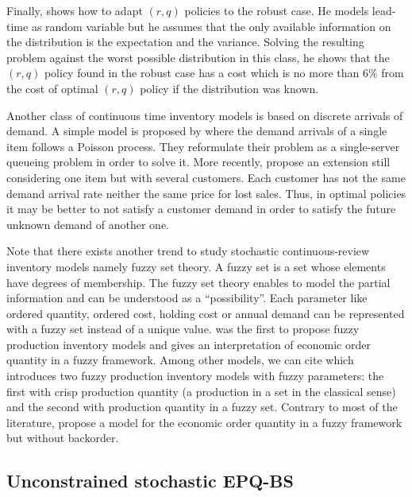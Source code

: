 Finally, \citet{Gallego1998} shows how to adapt $(r,q)$ policies to the robust case.
He models lead-time as random variable but he assumes that the only available information on the distribution is the expectation and the variance.
Solving the resulting problem against the worst possible distribution in this class, he shows that the $(r,q)$ policy found in the robust case has a cost which is no more than 6\% from the cost of optimal $(r,q)$ policy if the distribution was known.


\medskip


Another class of continuous time inventory models is based on discrete arrivals of demand.
A simple model is proposed by \citet{Gavish1980} where the demand arrivals of a single item follows a Poisson process.
They reformulate their problem as a single-server queueing problem in order to solve it.
More recently, \citet{Gayon2009} propose an extension still considering one item but with several customers.
Each customer has not the same demand arrival rate neither the same price for lost sales.
Thus, in optimal policies it may be better to not satisfy a customer demand in order to satisfy the future unknown demand of another one.


\medskip


Note that there exists another trend to study stochastic continuous-review inventory models namely fuzzy set theory.
A fuzzy set is a set whose elements have degrees of membership.
The fuzzy set theory enables to model the partial information and can be understood as a ``possibility''.
Each parameter like ordered quantity, ordered cost, holding cost or annual demand can be represented with a fuzzy set instead of a unique value.
\citet{Park1987} was the first to propose fuzzy production inventory models and gives an interpretation of economic order quantity in a fuzzy framework.
Among other models, we can cite \citet{Hsieh2002} which introduces two fuzzy production inventory models with fuzzy parameters: the first with crisp production quantity (\ie a production in a set in the classical sense) and the second with production quantity in a fuzzy set.
Contrary to most of the literature, \citet{Lee1999} propose a model for the economic order quantity in a fuzzy framework but without backorder.


\subsection{Unconstrained stochastic EPQ-BS}


